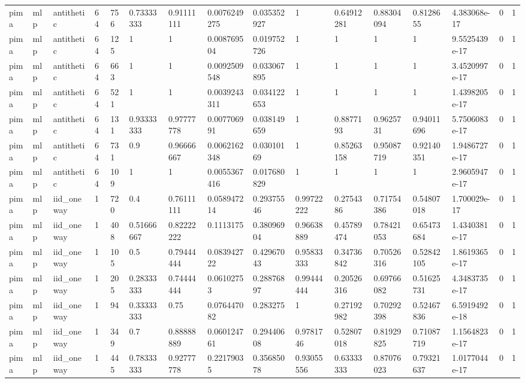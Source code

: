 \begin{tabular}{llllllllllllllll}
pima & mlp & antithetic & 64 & 756 & 0.73333333 & 0.91111111 & 0.0076249275 & 0.035352927 & 1 & 0.64912281 & 0.88304094 & 0.8128655 & 4.383068e-17 & 0 & 1 \\
pima & mlp & antithetic & 64 & 125 & 1 & 1 & 0.008769504 & 0.019752726 & 1 & 1 & 1 & 1 & 9.5525439e-17 & 0 & 1 \\
pima & mlp & antithetic & 64 & 663 & 1 & 1 & 0.0092509548 & 0.033067895 & 1 & 1 & 1 & 1 & 3.4520997e-17 & 0 & 1 \\
pima & mlp & antithetic & 64 & 521 & 1 & 1 & 0.0039243311 & 0.034122653 & 1 & 1 & 1 & 1 & 1.4398205e-17 & 0 & 1 \\
pima & mlp & antithetic & 64 & 131 & 0.93333333 & 0.97777778 & 0.007706991 & 0.038149659 & 1 & 0.8877193 & 0.9625731 & 0.94011696 & 5.7506083e-17 & 0 & 1 \\
pima & mlp & antithetic & 64 & 731 & 0.9 & 0.96666667 & 0.0062162348 & 0.03010169 & 1 & 0.85263158 & 0.95087719 & 0.92140351 & 1.9486727e-17 & 0 & 1 \\
pima & mlp & antithetic & 64 & 109 & 1 & 1 & 0.0055367416 & 0.017680829 & 1 & 1 & 1 & 1 & 2.9605947e-17 & 0 & 1 \\
pima & mlp & iid\_oneway & 1 & 720 & 0.4 & 0.76111111 & 0.058947214 & 0.29375546 & 0.99722222 & 0.2754386 & 0.71754386 & 0.54807018 & 1.700029e-17 & 0 & 1 \\
pima & mlp & iid\_oneway & 1 & 408 & 0.51666667 & 0.82222222 & 0.1113175 & 0.38096904 & 0.96638889 & 0.45789474 & 0.78421053 & 0.65473684 & 1.4340381e-17 & 0 & 1 \\
pima & mlp & iid\_oneway & 1 & 105 & 0.5 & 0.79444444 & 0.083942722 & 0.42967043 & 0.95833333 & 0.34736842 & 0.70526316 & 0.52842105 & 1.8619365e-17 & 0 & 1 \\
pima & mlp & iid\_oneway & 1 & 205 & 0.28333333 & 0.74444444 & 0.06102753 & 0.28876897 & 0.99444444 & 0.20526316 & 0.69766082 & 0.51625731 & 4.3483735e-17 & 0 & 1 \\
pima & mlp & iid\_oneway & 1 & 94 & 0.33333333 & 0.75 & 0.076447082 & 0.283275 & 1 & 0.27192982 & 0.70292398 & 0.52467836 & 6.5919492e-18 & 0 & 1 \\
pima & mlp & iid\_oneway & 1 & 349 & 0.7 & 0.88888889 & 0.060124761 & 0.29440608 & 0.9781746 & 0.52807018 & 0.81929825 & 0.71087719 & 1.1564823e-17 & 0 & 1 \\
pima & mlp & iid\_oneway & 1 & 445 & 0.78333333 & 0.92777778 & 0.22179035 & 0.35685078 & 0.93055556 & 0.63333333 & 0.87076023 & 0.79321637 & 1.0177044e-17 & 0 & 1 \\

\end{tabular}
